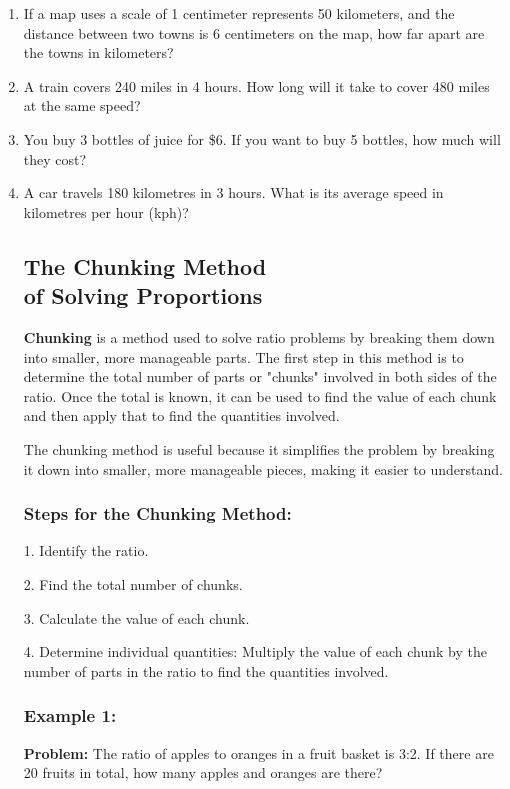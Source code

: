 \documentclass{article}
\begin{document}
\begin{spacing}{1.25}
\begin{enumerate}
\item If a map uses a scale of 1 centimeter represents 50 kilometers, and the distance between two towns is 6 centimeters on the map, how far apart are the towns in kilometers?
\item A train covers 240 miles in 4 hours. How long will it take to cover 480 miles at the same speed?
\item You buy 3 bottles of juice for \$6. If you want to buy 5 bottles, how much will they cost?
\item A car travels 180 kilometres in 3 hours. What is its average speed in kilometres per hour (kph)?

\subsection*{The Chunking Method\\of Solving Proportions}

\textbf{Chunking} is a method used to solve ratio problems by breaking them down into smaller, more manageable parts. The first step in this method is to determine the total number of parts or "chunks" involved in both sides of the ratio. Once the total is known, it can be used to find the value of each chunk and then apply that to find the quantities involved.

The chunking method is useful because it simplifies the problem by breaking it down into smaller, more manageable pieces, making it easier to understand.

\subsubsection*{Steps for the Chunking Method:}

1. Identify the ratio.

2. Find the total number of chunks.

3. Calculate the value of each chunk.

4. Determine individual quantities: Multiply the value of each chunk by the number of parts in the ratio to find the quantities involved.

\subsubsection*{Example 1:}

\textbf{Problem:} The ratio of apples to oranges in a fruit basket is 3:2. If there are 20 fruits in total, how many apples and oranges are there?


\end{enumerate}
\end{spacing}
\end{document}
